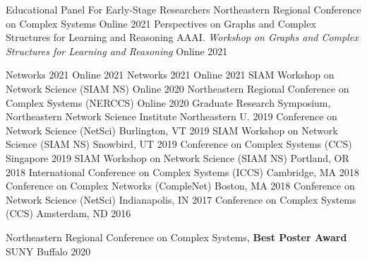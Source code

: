 \begin{cvhonors}
    \cvhonor
        {Educational Panel For Early-Stage Researchers} %
        {Northeastern Regional Conference on Complex Systems} %
        {Online} %
        {2021} %
    \cvhonor
        {Perspectives on Graphs and Complex Structures for Learning and Reasoning} %
        {AAAI. \emph{Workshop on Graphs and Complex Structures for Learning and Reasoning}} %
        {Online} %
        {2021} %
\end{cvhonors}


\begin{cvhonors}
    \cvhonorminor
        {} %
        {Networks 2021} %
        {Online} %
        {2021} %
    \cvhonorminor
        {} %
        {Networks 2021} %
        {Online} %
        {2021} %
    \cvhonorminor
        {} %
        {SIAM Workshop on Network Science (SIAM NS)} %
        {Online} %
        {2020} %
    \cvhonorminor
        {} %
        {Northeastern Regional Conference on Complex Systems (NERCCS)} %
        {Online} %
        {2020} %
    \cvhonorminor
        {} %
        {Graduate Research Symposium, Northeastern Network Science Institute} %
        {Northeastern U.} %
        {2019} %
    \cvhonorminor
        {} %
        {Conference on Network Science (NetSci)} %
        {Burlington, VT} %
        {2019} %
    \cvhonorminor
        {} %
        {SIAM Workshop on Network Science (SIAM NS)} %
        {Snowbird, UT} %
        {2019} %
    \cvhonorminor
        {} %
        {Conference on Complex Systems (CCS)} %
        {Singapore} %
        {2019} %
    \cvhonorminor
        {} %
        {SIAM Workshop on Network Science (SIAM NS)} %
        {Portland, OR} %
        {2018} %
    \cvhonorminor
        {} %
        {International Conference on Complex Systems (ICCS)} %
        {Cambridge, MA} %
        {2018} %
    \cvhonorminor
        {} %
        {Conference on Complex Networks (CompleNet)} %
        {Boston, MA} %
        {2018} %
    \cvhonorminor
        {} %
        {Conference on Network Science (NetSci)} %
        {Indianapolis, IN} %
        {2017} %
    \cvhonorminor
        {} %
        {Conference on Complex Systems (CCS)} %
        {Amsterdam, ND} %
        {2016} %
\end{cvhonors}

\begin{cvhonors}
    \cvhonorminor
        {} %
        {Northeastern Regional Conference on Complex Systems, 
        \textbf{Best Poster Award}} %
        {SUNY Buffalo} %
        {2020} %
\end{cvhonors}